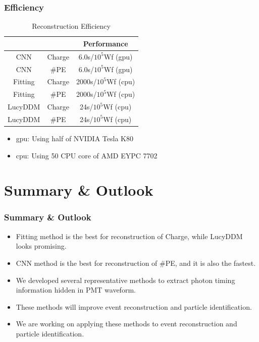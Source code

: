 \documentclass{beamer}
\begin{document}
\begin{frame}
\frametitle{Efficiency}
\begin{table}
    \centering
    \caption{Reconstruction Efficiency}
    \begin{tabular}{c|c|c}
        \hline
        &  & Performance \\
        \hline
        CNN & Charge & 6.0s/$10^{5}$Wf (gpu) \\
        \hline
        CNN & \#PE & 6.0s/$10^{5}$Wf (gpu)\\
        \hline
        Fitting & Charge & 2000s/$10^{5}$Wf (cpu) \\
        \hline
        Fitting & \#PE & 2000s/$10^{5}$Wf (cpu) \\
        \hline
        LucyDDM & Charge & 24s/$10^{5}$Wf (cpu) \\
        \hline
        LucyDDM & \#PE & 24s/$10^{5}$Wf (cpu) \\
        \hline
    \end{tabular}
\end{table}
\hspace{4mm}\begin{itemize}
    \item gpu: Using half of NVIDIA Tesla K80
    \item cpu: Using 50 CPU core of AMD EYPC 7702
\end{itemize}
\end{frame}

\section{Summary \& Outlook}
\begin{frame}
\frametitle{Summary \& Outlook}
\begin{itemize}
    \item Fitting method is the best for reconstruction of Charge, while LucyDDM looks promising. 
    \item CNN method is the best for reconstruction of \#PE, and it is also the fastest. 
    \item We developed several representative methods to extract photon timing information hidden in PMT waveform. 
    \item These methods will improve event reconstruction and particle identification. 
    \item We are working on applying these methods to event reconstruction and particle identification. 
\end{itemize}
\end{frame}
\end{document}
